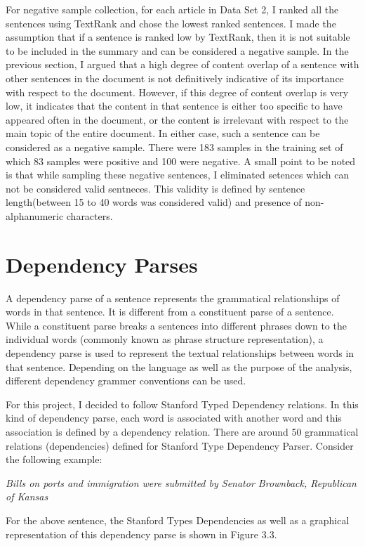 For negative sample collection, for each article in Data Set 2, I ranked all the sentences using TextRank and chose the lowest ranked sentences.
I made the assumption that if a sentence is ranked low by TextRank, then it is not suitable to be included in the summary and can be considered a negative sample.
In the previous section, I argued that a high degree of content overlap of a sentence with other sentences in the document is not definitively indicative of its importance with respect to the document.
However, if this degree of content overlap is very low, it indicates that the content in that sentence is either too specific to have appeared often in the document, or the content is irrelevant with respect to the main topic of the entire document.
In either case, such a sentence can be considered as a negative sample.
There were 183 samples in the training set of which 83 samples were positive and 100 were negative.
A small point to be noted is that while sampling these negative sentences, I eliminated setences which can not be considered valid sentneces. This validity is defined by sentence length(between 15 to 40 words was considered valid) and presence of non-alphanumeric characters.

\section{Dependency Parses}
A dependency parse of a sentence represents the grammatical relationships of words in that sentence.
It is different from a constituent parse of a sentence.
While a constituent parse breaks a sentences into different phrases down to the individual words (commonly known as phrase structure representation), a dependency parse is used to represent the textual relationships between words in that sentence.
Depending on the language as well as the purpose of the analysis, different dependency grammer conventions can be used.

For this project, I decided to follow Stanford Typed Dependency relations.
In this kind of dependency parse, each word is associated with another word and this association is defined by a dependency relation.
There are around 50 grammatical relations (dependencies) defined for Stanford Type Dependency Parser.
Consider the following example:

\emph{Bills on ports and immigration were submitted by Senator Brownback, Republican of Kansas}

For the above sentence, the Stanford Types Dependencies as well as a graphical representation of this dependency parse is shown in Figure 3.3.

